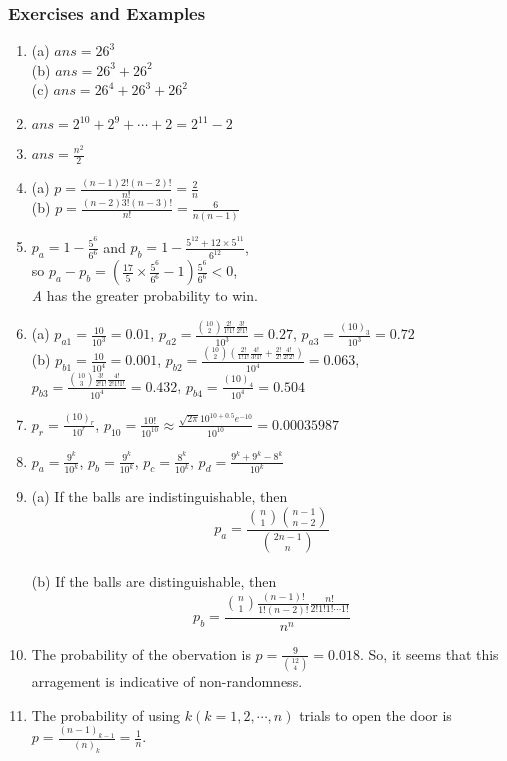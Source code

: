\documentclass{article}
\numberwithin{equation}{subsection}
\begin{document}
		\subsubsection{Exercises and Examples}
		\begin{enumerate}
		\item (a) $ans=26^3$ \\ (b) $ans=26^3+26^2$ \\ (c) $ans=26^4+26^3+26^2$
		\item $ans=2^{10}+2^9+\cdots+2=2^{11}-2$
		\item $ans = \frac{n^2}{2}$
		\item (a) $p=\frac{(n-1)2!(n-2)!}{n!} = \frac{2}{n}$ \\ (b) $p=\frac{(n-2)3!(n-3)!}{n!} = \frac{6}{n(n-1)}$
		\item $p_a = 1-\frac{5^6}{6^6}$ and $p_b = 1-\frac{5^{12}+12\times5^{11}}{6^{12}}$, \\so $p_a-p_b = \left(\frac{17}{5}\times\frac{5^{6}}{6^{6}}-1\right)\frac{5^6}{6^6} < 0 $, \\ \textit{A} has the greater probability to win.
		\item (a) $p_{a1}=\frac{10}{10^3} = 0.01$, $p_{a2} = \frac{{10\choose 2}\frac{2!}{1!1!}\frac{3!}{2!1!}}{10^3} = 0.27$, $p_{a3} = \frac{(10)_3}{10^3} = 0.72$\\ (b) $p_{b1} = \frac{10}{10^4} = 0.001$, $p_{b2}=\frac{{10\choose 2}\left(\frac{2!}{1!1!}\frac{4!}{3!1!}+\frac{2!}{2!}\frac{4!}{2!2!}\right)}{10^4} = 0.063$, \\  $p_{b3}=\frac{{10\choose 3}\frac{3!}{2!1!}\frac{4!}{2!1!1!}}{10^4} = 0.432 $, $p_{b4} = \frac{(10)_4}{10^4} = 0.504$
		\item $p_r = \frac{(10)_r}{10^r}$, $p_{10} = \frac{10!}{10^{10}} \approx \frac{\sqrt{2\pi}10^{10+0.5}e^{-10}}{10^{10}} = 0.00035987$
		\item $p_a=\frac{9^k}{10^k}$, $p_b=\frac{9^k}{10^k}$, $p_c=\frac{8^k}{10^k}$, $p_d= \frac{9^k+9^k-8^k}{10^k}$
		\item (a) If the balls are indistinguishable, then $$p_a=\frac{{n \choose 1}{n-1 \choose n-2}}{{2n-1\choose n}}$$ \\ (b) If the balls are distinguishable, then $$p_b=\frac{{n\choose 1}\frac{(n-1)!}{1!(n-2)!}\frac{n!}{2!1!1!\cdots1!}}{n^n}$$
		\item The probability of the obervation is $p = \frac{9}{{12\choose 4}} = 0.018$. So, it seems that this arragement is indicative of non-randomness.
		\item The probability of using $k (k=1,2,\cdots,n)$ trials to open the door is $p=\frac{(n-1)_{k-1}}{(n)_k}=\frac{1}{n}$.

\end{enumerate}
\end{document}

